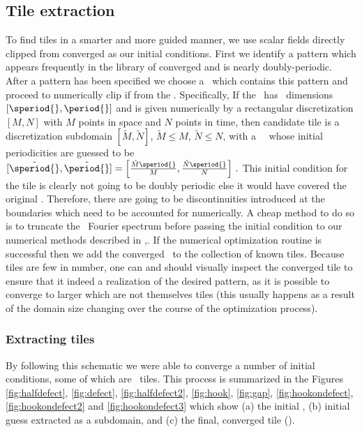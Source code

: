 \subsection{Tile extraction}

To find tiles in a smarter and more guided manner,
we use scalar fields directly clipped
from converged \twots as our initial conditions.
First we identify a pattern which appears frequently
in the library of converged \twots and is nearly
doubly-periodic. After a pattern
has been specified we choose a \twot\
which contains this pattern
and proceed to numerically clip if from
the \twot. Specifically,
If the \twot\ has \spt\ dimensions $[\speriod{},\period{}]$
and is given numerically by a
rectangular discretization $[M,N]$ with $M$ points in space
and $N$ points in time, then candidate tile
is a discretization subdomain  $[\tilde{M},\tilde{N}]$,
 $\tilde{M} \leq M$, $\tilde{N} \leq N$, with
a \spt\ \twot\ whose initial periodicities are
guessed to be
\(
[\tilde{\speriod{}},\tilde{\period{}}]
=\left[\frac{\tilde{M}\speriod{}}{M},\frac{\tilde{N}\speriod{}}{N}\right]
\,.
\)
This initial condition for the tile is clearly not going to be
doubly periodic else it would have
covered the original \twot. Therefore, there
are going to be discontinuities introduced at the
boundaries which need to be accounted for numerically.
A cheap method to do so is to
truncate the \spt\ Fourier spectrum before
passing the initial condition to our numerical methods
described in
,.
If the numerical optimization routine is successful
then we add
the converged \twot\ to the collection of known tiles.
Because tiles are few in number, one can and should
visually inspect the converged tile to ensure that it indeed
a realization of the desired pattern, as it is possible
to converge to larger \twots which are not themselves
tiles (this usually happens as a result of the domain
size changing over the course of the optimization
process).
\subsubsection{Extracting tiles}
By following this schematic we were able
to converge a number of initial conditions,
some of which are \spt\ tiles.
This process is summarized in
the Figures
\ref{fig:halfdefect},
\ref{fig:defect},
\ref{fig:halfdefect2},
\ref{fig:hook},
\ref{fig:gap},
\ref{fig:hookondefect},
\ref{fig:hookondefect2}
and
\ref{fig:hookondefect3}
which show
(a) the initial \twot,
(b) initial guess extracted as a subdomain, and
(c) the final, converged tile (\twot).

